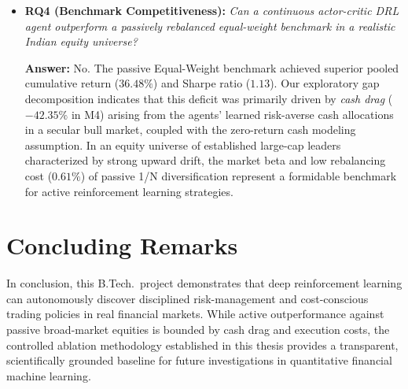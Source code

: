 \begin{itemize}
    \item \textbf{RQ4 (Benchmark Competitiveness):} \textit{Can a continuous actor-critic DRL agent outperform a passively rebalanced equal-weight benchmark in a realistic Indian equity universe?}
    
    \textbf{Answer:} No. The passive Equal-Weight benchmark achieved superior pooled cumulative return ($36.48\%$) and Sharpe ratio ($1.13$). Our exploratory gap decomposition indicates that this deficit was primarily driven by \textit{cash drag} ($-42.35\%$ in M4) arising from the agents' learned risk-averse cash allocations in a secular bull market, coupled with the zero-return cash modeling assumption. In an equity universe of established large-cap leaders characterized by strong upward drift, the market beta and low rebalancing cost ($0.61\%$) of passive 1/N diversification represent a formidable benchmark for active reinforcement learning strategies.
\end{itemize}

\section{Concluding Remarks}
In conclusion, this B.Tech.\ project demonstrates that deep reinforcement learning can autonomously discover disciplined risk-management and cost-conscious trading policies in real financial markets. While active outperformance against passive broad-market equities is bounded by cash drag and execution costs, the controlled ablation methodology established in this thesis provides a transparent, scientifically grounded baseline for future investigations in quantitative financial machine learning.
